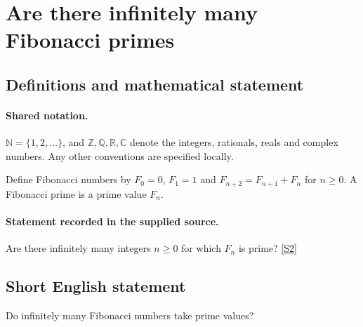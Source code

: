\documentclass[11pt]{article}
\newcommand{\sref}[2]{\hyperlink{source:#1:#2}{[S#2]}}
\begin{document}
\section{Are there infinitely many Fibonacci primes}\label{statement}

\subsection{Definitions and mathematical statement}

\paragraph{Shared notation.}$\mathbb N=\{1,2,\ldots\}$, and $\mathbb Z,\mathbb Q,\mathbb R,\mathbb C$ denote the integers, rationals, reals and complex numbers. Any other conventions are specified locally.


Define Fibonacci numbers by $F_0=0$, $F_1=1$ and $F_{n+2}=F_{n+1}+F_n$ for $n\ge0$. A Fibonacci prime is a prime value $F_n$.
\paragraph{Statement recorded in the supplied source.}
Are there infinitely many integers $n\ge0$ for which $F_n$ is prime? \sref{statement}{2}
\subsection{Short English statement}
Do infinitely many Fibonacci numbers take prime values?
\end{document}

